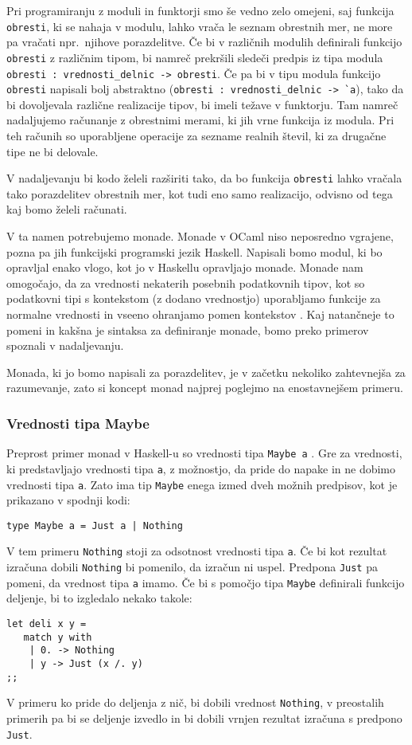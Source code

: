 \documentclass[a4paper,12pt]{article}
\theoremstyle{definition} %
\begin{document}
Pri programiranju z moduli in funktorji smo še vedno zelo omejeni, saj funkcija \lstinline{obresti}, ki se nahaja v modulu, lahko vrača le seznam obrestnih mer, ne more pa vračati npr.\ njihove porazdelitve.  Če bi v različnih modulih definirali funkcijo \lstinline{obresti} z različnim tipom, bi namreč prekršili sledeči predpis iz tipa modula \lstinline{obresti : vrednosti_delnic -> obresti}. Če pa bi v tipu modula funkcijo \lstinline{obresti} napisali bolj abstraktno (\lstinline{obresti : vrednosti_delnic -> `a}), tako da bi dovoljevala različne realizacije tipov, bi imeli težave v funktorju. Tam namreč nadaljujemo računanje z obrestnimi merami, ki jih vrne funkcija iz modula. Pri teh računih so uporabljene operacije za sezname realnih števil, ki za drugačne tipe ne bi delovale.

V nadaljevanju bi kodo želeli razširiti tako, da bo funkcija \lstinline{obresti}
lahko vračala tako porazdelitev obrestnih mer, kot tudi eno samo realizacijo, odvisno od tega kaj bomo želeli računati.

V ta namen potrebujemo monade. Monade v OCaml niso neposredno vgrajene, pozna pa jih funkcijski programski jezik Haskell. Napisali bomo modul, ki bo opravljal enako vlogo, kot jo v Haskellu opravljajo monade. 
Monade nam omogočajo, da za vrednosti nekaterih posebnih podatkovnih tipov, kot so podatkovni tipi s kontekstom (z dodano vrednostjo) uporabljamo funkcije za normalne vrednosti in vseeno ohranjamo pomen kontekstov \cite{haskell}. Kaj natančneje to pomeni in kakšna je sintaksa za definiranje monade, bomo preko primerov spoznali v nadaljevanju.

Monada, ki jo bomo napisali za porazdelitev, je v začetku nekoliko zahtevnejša za razumevanje, zato si koncept monad najprej poglejmo na enostavnejšem primeru.


\subsubsection*{Vrednosti tipa Maybe}

Preprost primer monad v Haskell-u so vrednosti tipa \lstinline{Maybe a} \cite{haskell}. Gre za vrednosti, ki predstavljajo vrednosti tipa \lstinline{a}, z možnostjo, da pride do napake in ne dobimo vrednosti tipa
\lstinline{a}. Zato ima tip \lstinline{Maybe} enega izmed dveh možnih predpisov, kot je prikazano v spodnji kodi:
\begin{lstlisting}
type Maybe a = Just a | Nothing
\end{lstlisting}
V tem primeru \lstinline{Nothing} stoji za odsotnost vrednosti tipa \lstinline{a}. Če bi kot rezultat izračuna dobili \lstinline{Nothing}  bi pomenilo, da izračun ni uspel. Predpona \lstinline{Just} pa pomeni, da vrednost tipa \lstinline{a} imamo. Če bi  s pomočjo tipa \lstinline{Maybe} definirali funkcijo deljenje, bi to izgledalo nekako takole:
\begin{lstlisting}
let deli x y =
   match y with
	| 0. -> Nothing
	| y -> Just (x /. y)
;;
\end{lstlisting}
V primeru ko pride do deljenja z nič, bi dobili vrednost \lstinline{Nothing}, v preostalih primerih pa bi se deljenje izvedlo in bi dobili vrnjen rezultat izračuna s predpono \lstinline{Just}. 
\end{document}

